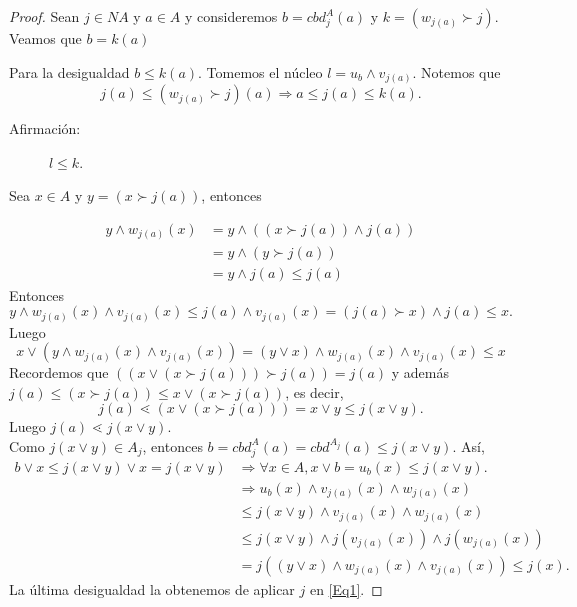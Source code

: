 \documentclass[12pt,letterpaper,titlepage]{article}
\theoremstyle{definition}
\newcommand\<{\langle}
\renewcommand\>{\rangle}
\begin{document}
\begin{proof}
Sean $j\in NA$ y $a\in A$ y consideremos $b=cbd_j^A(a)$ y $k=(w_{j(a)}\succ j)$. Veamos que $b=k(a)$

\noindent
Para la desigualdad $b\leq k(a)$. Tomemos el núcleo $l=u_b\wedge v_{j(a)}$. Notemos que $$j(a)\leq (w_{j(a)}\succ j)(a)\Rightarrow a\leq j(a)\leq k(a).$$

\begin{description}
\item[Afirmación:] $l\leq k$.
\end{description}

Sea $x\in A$ y $y=(x\succ j(a))$, entonces

\begin{equation*}
\begin{split}
y\wedge w_{j(a)}(x) &=y\wedge ((x\succ j(a))\wedge j(a))\\
& =y\wedge(y\succ j(a))\\
& =y\wedge j(a)\leq j(a)
\end{split}
\end{equation*}
Entonces $$y\wedge w_{j(a)}(x)\wedge v_{j(a)}(x)\leq j(a)\wedge v_{j(a)}(x)=(j(a)\succ x)\wedge j(a)\leq x.$$
Luego
\begin{equation}\label{Eq1}
x\vee (y\wedge w_{j(a)}(x)\wedge v_{j(a)}(x))=(y\vee x)\wedge w_{j(a)}(x)\wedge v_{j(a)}(x)\leq x
\end{equation}
Recordemos que $((x\vee (x\succ j(a)))\succ j(a))=j(a)$ y además $j(a)\leq (x\succ j(a))\leq x\vee (x\succ j(a))$, es decir,
$$j(a)\lessdot (x\vee (x\succ j(a)))=x\vee y\leq j(x\vee y).$$
Luego $j(a)\lessdot j(x\vee y).$\\
Como $j(x\vee y)\in A_j$, entonces $b=cbd_j^A(a)=cbd^{A_j}(a)\leq j(x\vee y)$. Así,
\begin{equation*}
\begin{split}
b\vee x\leq j(x\vee y)\vee x=j(x\vee y) &\Rightarrow  \forall x\in A, x\vee b=u_b(x)\leq j(x\vee y).\\
& \Rightarrow u_b(x)\wedge v_{j(a)}(x)\wedge w_{j(a)}(x)\\
& \leq j(x\vee y)\wedge v_{j(a)}(x)\wedge w_{j(a)}(x)\\ 
& \leq j(x\vee y)\wedge j(v_{j(a)}(x))\wedge j(w_{j(a)}(x))\\
& =j((y\vee x)\wedge w_{j(a)}(x)\wedge v_{j(a)}(x))\leq j(x).
\end{split}
\end{equation*}
La última desigualdad la obtenemos de aplicar $j$ en \eqref{Eq1}.


\end{proof}
\end{document}
